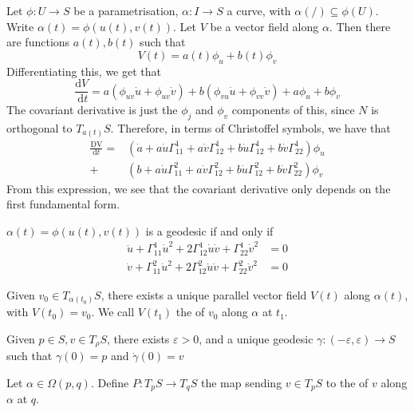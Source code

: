 \documentclass[10pt]{article}
\begin{document}
Let $\phi: U \rightarrow S$ be a parametrisation, $\alpha: I \rightarrow S$ a curve, with $\alpha(/) \subseteq \phi(U)$. Write $\alpha(t)=\phi(u(t), v(t))$. Let $V$ be a vector field along $\alpha$. Then there are functions $a(t), b(t)$ such that
$$
V(t)=a(t) \phi_u+b(t) \phi_v
$$
Differentiating this, we get that
$$
\frac{\mathrm{d} V}{\mathrm{~d} t}=a\left(\phi_{u v} \dot{u}+\phi_{u v} \dot{v}\right)+b\left(\phi_{v u} \dot{u}+\phi_{v v} \dot{v}\right)+a \phi_u+b \phi_v
$$
The covariant derivative is just the $\phi_j$ and $\phi_v$ components of this, since $N$ is orthogonal to $T_{a(t)} S$. Therefore, in terms of Christoffel symbols, we have that
\begin{align*}
\frac{\mathrm{DV}}{\mathrm{d} t}= &\left(\dot{a}+a \dot{u} \Gamma_{11}^1+a \dot{v} \Gamma_{12}^1+b \dot{u} \Gamma_{12}^1+b \dot{v} \Gamma_{22}^1\right) \phi_u\\+&\left(b+a \dot{u} \Gamma_{11}^2+a \dot{v} \Gamma_{12}^2+b \dot{u} \Gamma_{12}^2+b \dot{v} \Gamma_{22}^2\right) \phi_v
\end{align*}
From this expression, we see that the covariant derivative only depends on the first fundamental form.

\begin{proposition}
$\alpha(t)=\phi(u(t), v(t))$ is a geodesic if and only if
$$
\begin{aligned}
\ddot{u}+\Gamma_{11}^1 \dot{u}^2+2 \Gamma_{12}^1 \dot{u} \dot{v}+\Gamma_{22}^1 \dot{v}^2&=0 \\
 \dot{v}+\Gamma_{11}^2 \dot{u}^2+2 \Gamma_{12}^2 \dot{u} \dot{v}+\Gamma_{22}^2 \dot{v}^2&=0
\end{aligned}
$$
\end{proposition}

\begin{proposition}
    Given $v_0 \in T_{\alpha\left(t_0\right)} S$, there exists a unique parallel vector field $V(t)$ along $\alpha(t)$, with $V\left(t_0\right)=v_0$. We call $V\left(t_1\right)$ the  of $v_0$ along $\alpha$ at $t_1$.
\end{proposition}

\begin{corollary}
    Given $p \in S, v \in T_\rho S$, there exists $\varepsilon>0$, and a unique geodesic $\gamma:(-\varepsilon, \varepsilon) \rightarrow S$ such that $\gamma(0)=p$ and $\dot{\gamma}(0)=v$
\end{corollary}

\begin{definition}
    Let $\alpha \in \Omega(p, q)$. Define $P: T_p S \rightarrow T_q S$ the map sending $v \in T_p S$ to the  of $v$ along $\alpha$ at $q$.
\end{definition}
\end{document}
